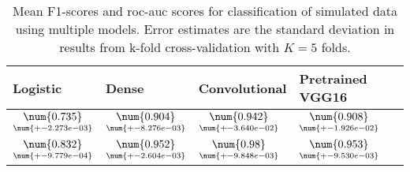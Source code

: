 \begin{table}
\centering
\caption{
Mean F1-scores and roc-auc scores for classification of simulated data using multiple models. 
Error estimates are the standard deviation in results from k-fold cross-validation 
with $K=5$ folds.
}
\label{tab:classification-simulated-f1-auc}
\begin{tabular}{llll}
\toprule
                                           Logistic &                                               Dense &                                       Convolutional &                                    Pretrained VGG16 \\
\midrule
 $\underset{\num{+- 2.273e-03 }  }{\num{ 0.735 } }$ &  $\underset{\num{+- 8.276e-03 }  }{\num{ 0.904 } }$ &  $\underset{\num{+- 3.640e-02 }  }{\num{ 0.942 } }$ &  $\underset{\num{+- 1.926e-02 }  }{\num{ 0.908 } }$ \\
 $\underset{\num{+- 9.779e-04 }  }{\num{ 0.832 } }$ &  $\underset{\num{+- 2.604e-03 }  }{\num{ 0.952 } }$ &  $\underset{\num{+- 9.848e-03 }  }{\num{ 0.98 } }$ &  $\underset{\num{+- 9.530e-03 }  }{\num{ 0.953 } }$ \\
\bottomrule
\end{tabular}
\end{table}
